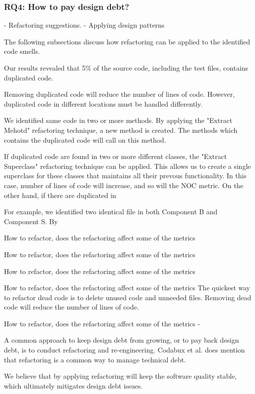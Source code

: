 \subsubsection{RQ4: How to pay design debt?} 
- Refactoring suggestions.
- Applying design patterns

The following subsections discuss how refactoring can be applied to the identified code smells.

Our results revealed that 5\% of the source code, including the test files, contains duplicated code. 

Removing duplicated code will reduce the number of lines of code. However, duplicated code in different locations must be handled differently.

We identified same code in two or more methods. By applying the "Extract Mehotd" refactoring technique, a new method is created. The methods which contains the duplicated code will call on this method.

If duplicated code are found in two or more different classes, the "Extract Superclass" refactoring technique can be applied. This allows us to create a single superclass for these classes that maintains all their prevous functionality. In this case, number of lines of code will increase, and so will the NOC metric. On the other hand, if there are duplicated in

For example, we identified two identical file in both Component B and Component S. By 

How to refactor, does the refactoring affect some of the metrics

How to refactor, does the refactoring affect some of the metrics

How to refactor, does the refactoring affect some of the metrics

How to refactor, does the refactoring affect some of the metrics
The quickest way to refactor dead code is to delete unused code and unneeded files. Removing dead code will reduce the number of lines of code. 

How to refactor, does the refactoring affect some of the metrics
-

A common approach to keep design debt from growing, or to pay back design debt, is to conduct refactoring and re-engineering. Codabux et al.\cite{p8-codabux} does mention that refactoring is a common way to manage technical debt. 

We believe that by applying refactoring will keep the software quality stable, which ultimately mitigates design debt issues.




